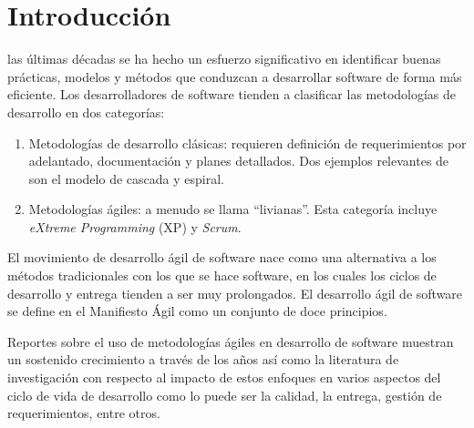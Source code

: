 \documentclass[journal]{IEEEtran}
\begin{document}
%
\IEEEpeerreviewmaketitle



\section{Introducción}
% 
% 
% 
% 
 las últimas décadas se ha hecho un esfuerzo significativo en identificar buenas prácticas, modelos y métodos que conduzcan a desarrollar software de forma más eficiente. Los desarrolladores de software tienden a clasificar las metodologías de desarrollo en dos categorías\cite{li-jian-armin-eberlein}:
\begin{enumerate}
    \item Metodologías de desarrollo clásicas: requieren definición de requerimientos por adelantado, documentación y planes detallados. Dos ejemplos relevantes de son el modelo de cascada y espiral.
    \item Metodologías ágiles: a menudo se llama ``livianas''. Esta categoría incluye \emph{eXtreme Programming} (XP) y \emph{Scrum}.
\end{enumerate}

El movimiento de desarrollo ágil de software nace como una alternativa a los métodos tradicionales con los que se hace software, en los cuales los ciclos de desarrollo y entrega tienden a ser muy  prolongados. El desarrollo ágil de software se define en el Manifiesto Ágil \cite{agile-manifesto} como un conjunto de doce principios. 

Reportes sobre el uso de metodologías ágiles en desarrollo de software muestran un sostenido crecimiento a través de los años\cite{version-one} así como la literatura de investigación con respecto al impacto de estos enfoques en varios aspectos del ciclo de vida de desarrollo como lo puede ser la calidad, la entrega, gestión de requerimientos, entre otros. 
\end{document}
